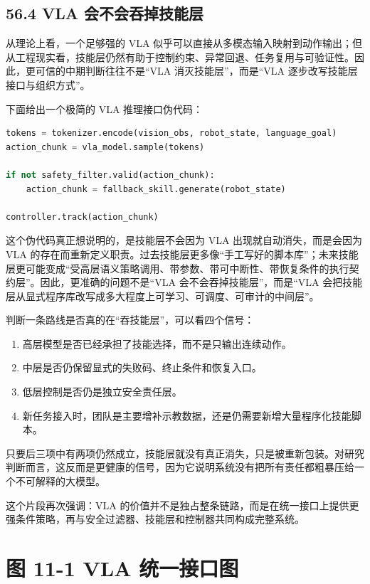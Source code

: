 \section*{56.4 VLA 会不会吞掉技能层}


从理论上看，一个足够强的 VLA 似乎可以直接从多模态输入映射到动作输出；但从工程现实看，技能层仍然有助于控制约束、异常回退、任务复用与可验证性。因此，更可信的中期判断往往不是“VLA 消灭技能层”，而是“VLA 逐步改写技能层接口与组织方式”。

下面给出一个极简的 VLA 推理接口伪代码：

\begin{lstlisting}[language=python]
tokens = tokenizer.encode(vision_obs, robot_state, language_goal)
action_chunk = vla_model.sample(tokens)

if not safety_filter.valid(action_chunk):
    action_chunk = fallback_skill.generate(robot_state)

controller.track(action_chunk)
\end{lstlisting}

这个伪代码真正想说明的，是技能层不会因为 VLA 出现就自动消失，而是会因为 VLA 的存在而重新定义职责。过去技能层更多像“手工写好的脚本库”；未来技能层更可能变成“受高层语义策略调用、带参数、带可中断性、带恢复条件的执行契约层”。因此，更准确的问题不是“VLA 会不会吞掉技能层”，而是“VLA 会把技能层从显式程序库改写成多大程度上可学习、可调度、可审计的中间层”。

判断一条路线是否真的在“吞技能层”，可以看四个信号：

\begin{enumerate}
\item 高层模型是否已经承担了技能选择，而不是只输出连续动作。
\item 中层是否仍保留显式的失败码、终止条件和恢复入口。
\item 低层控制是否仍是独立安全责任层。
\item 新任务接入时，团队是主要增补示教数据，还是仍需要新增大量程序化技能脚本。
\end{enumerate}

只要后三项中有两项仍然成立，技能层就没有真正消失，只是被重新包装。对研究判断而言，这反而是更健康的信号，因为它说明系统没有把所有责任都粗暴压给一个不可解释的大模型。

这个片段再次强调：VLA 的价值并不是独占整条链路，而是在统一接口上提供更强条件策略，再与安全过滤器、技能层和控制器共同构成完整系统。

\chapter*{图 11-1 VLA 统一接口图}

